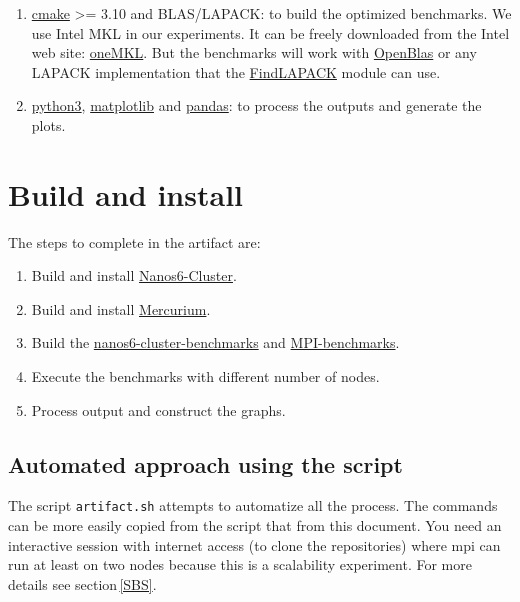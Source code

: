 \documentclass{article}
\newcommand{\code}[1]{\texttt{#1}}
\begin{document}
\begin{enumerate}
    \item \href{https://cmake.org/}{cmake} >= 3.10 and BLAS/LAPACK: to build
        the optimized benchmarks.  We use Intel MKL in our experiments.
        It can be freely downloaded from the Intel web site:
        \href{https://www.intel.com/content/www/us/en/developer/tools/oneapi/onemkl-download.html}{oneMKL}.
        But the benchmarks will work with \href{https://www.openblas.net/}{OpenBlas}
        or any LAPACK implementation that the
        \href{https://cmake.org/cmake/help/latest/module/FindLAPACK.html}{FindLAPACK}
        module can use.

    \item \href{https://www.python.org/downloads/}{python3},
        \href{https://matplotlib.org/}{matplotlib} and
        \href{https://pandas.pydata.org/}{pandas}: to process the outputs
        and generate the plots.

\end{enumerate}

\section{Build and install}

The steps to complete in the artifact are:

\begin{enumerate}
    \item Build and install \href{https://github.com/bsc-pm/nanos6-cluster}{Nanos6-Cluster}.
    \item Build and install \href{https://github.com/bsc-pm/mcxx}{Mercurium}.
    \item Build the \href{https://github.com/Ergus/nanos-cluster-benchmarks}{nanos6-cluster-benchmarks}
        and \href{https://github.com/Ergus/MPI_Benchmarks}{MPI-benchmarks}.
    \item Execute the benchmarks with different number of nodes.
    \item Process output and construct the graphs.
\end{enumerate}

\subsection{Automated approach using the script}

The script \code{artifact.sh} attempts to automatize all the process.
The commands can be more easily copied from the script that from this
document.  You need an interactive session with internet access (to
clone the repositories) where mpi can run at least on two nodes
because this is a scalability experiment.  For more details see
section\,\ref{SBS}.
\end{document}
